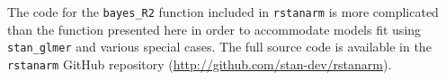 \documentclass[11pt]{article}
\begin{document}
\noindent The code for the \verb#bayes_R2# function included in {\tt rstanarm}
is more complicated than the function presented here in order to
accommodate models fit using \verb#stan_glmer# and various special cases.
The full source code is available in the {\tt rstanarm} GitHub repository
(\url{http://github.com/stan-dev/rstanarm}).
\end{document}
